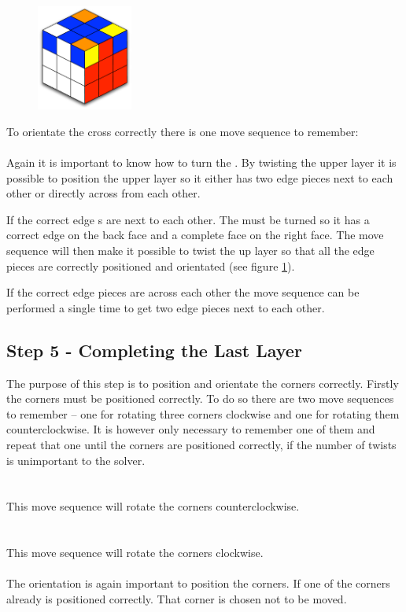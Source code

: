 \begin{figure}
\begin{center}
	\includegraphics[width=0.28\textwidth]{input/pics/7LLedges.pdf}	
\end{center}
\caption{}
\label{fig:7LLedges}
\end{figure}


To orientate the cross correctly there is one move sequence to remember: \\

 \\

Again it is important to know how to turn the \cube{}. By twisting the upper layer it is possible to position the upper layer so it either has two edge pieces next to each other or directly across from each other.

If the correct edge \cpiece{}s are next to each other. 
The \cube{} must be turned so it has a correct edge \cpiece{} on the back face and a complete face on the right face. 
The move sequence will then make it possible to twist the up layer so that all the edge pieces are correctly positioned and orientated (see figure \ref{fig:7LLedges}). 

If the correct edge pieces are across each other the move sequence can be performed a single time to get two edge pieces next to each other. 


\subsection{Step 5 - Completing the Last Layer}\label{sub:step5}
The purpose of this step is to position and orientate the corners correctly. Firstly the corners must be positioned correctly. To do so there are two move sequences to remember -- one for rotating three corners clockwise and one for rotating them counterclockwise. It is however only necessary to remember one of them and repeat that one until the corners are positioned correctly, if the number of twists is unimportant to the solver. \\
\\
\\
This move sequence will rotate the corners counterclockwise.
\\
\\
\\
This move sequence will rotate the corners clockwise.
\\
\\
The orientation is again important to position the corners. If one of the corners already is positioned correctly. That corner is chosen not to be moved. 

